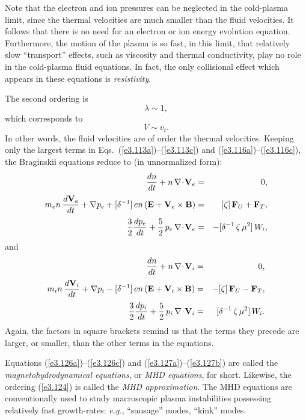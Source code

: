 Note that the electron and ion pressures can be neglected in the cold-plasma
limit, since the thermal velocities are much smaller than the
fluid velocities. It follows that there is no need for an electron
or  ion energy evolution equation. Furthermore, the motion of the
plasma is so fast, in this limit, that relatively slow ``transport'' effects,
such as viscosity and thermal conductivity, play no role in the cold-plasma
fluid equations. In fact, the only collisional effect which appears in these
equations is {\em resistivity}. 


The second ordering is
\begin{equation}\label{e3.124}
\lambda \sim 1,
\end{equation}
which corresponds to
\begin{equation}
V \sim v_t.
\end{equation}
In other words, the fluid velocities are of order the thermal
velocities. Keeping only the largest terms in Eqs.~(\ref{e3.113a})--(\ref{e3.113c}) and (\ref{e3.116a})--(\ref{e3.116c}),
the Braginskii equations reduce to (in unnormalized form):
\begin{eqnarray}\label{e3.126a}
\frac{dn}{dt} + n\,\nabla\!\cdot\!{\bf V}_e &=& 0,\\[0.5ex]
m_e n\,\frac{d {\bf V}_e}{dt} + \nabla p_e+   [\delta^{-1}]\,e n\,
({\bf E} + {\bf V}_e\times {\bf B})& =& [\zeta]\,{\bf F}_U + {\bf F}_T,\\[0.5ex]
\frac{3}{2}\frac{d p_e}{dt} + \frac{5}{2}\,p_e\,\nabla\!\cdot\!{\bf V}_e
&=& -[\delta^{-1}\,\zeta\,\mu^2]\,W_i,\label{e3.126c}
\end{eqnarray}
and
\begin{eqnarray}\label{e3.127a}
\frac{dn}{dt} + n\,\nabla\!\cdot\!{\bf V}_i &=& 0,\\[0.5ex]
m_i n\,\frac{d {\bf V}_i}{dt} + \nabla p_i - [\delta^{-1}]\, e n\,
({\bf E} + {\bf V}_i\times {\bf B})& =&- [\zeta]\,{\bf F}_U
-{\bf F}_T,\label{e3.127b}\\[0.5ex]
\frac{3}{2}\frac{d p_i}{dt} + \frac{5}{2}\,p_i\,\nabla\!\cdot\!{\bf V}_i
 &=&[\delta^{-1}\,\zeta\,\mu^2]\, W_i.\label{e3.127c}
\end{eqnarray}
Again, the factors in square brackets remind us that the terms they precede
are larger, or smaller, than the other terms in the equations. 

Equations (\ref{e3.126a})--(\ref{e3.126c}) and (\ref{e3.127a})--(\ref{e3.127b}) are called the {\em magnetohydrodynamical equations},
or {\em MHD equations}, for short. Likewise, the ordering (\ref{e3.124}) is called
the {\em MHD approximation}. The MHD equations are conventionally
used to study macroscopic  plasma
instabilities possessing  relatively fast growth-rates: {\em e.g.},
``sausage'' modes, ``kink'' modes. 

